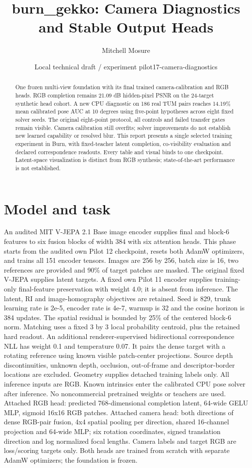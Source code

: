 \documentclass[10pt]{article}
\title{burn\_gekko: Camera Diagnostics and Stable Output Heads}\author{Mitchell Mosure}\date{Local technical draft / experiment pilot17-camera-diagnostics}
\begin{document}
\maketitle
\begin{abstract}
One frozen multi-view foundation with its final trained camera-calibration and RGB heads. RGB completion remains 21.09 dB hidden-pixel PSNR on the 24-target synthetic head cohort. A new CPU diagnostic on 186 real TUM pairs reaches 14.19\% mean calibrated pose AUC at 10 degrees using five-point hypotheses across eight fixed solver seeds. The original eight-point protocol, all controls and failed transfer gates remain visible. Camera calibration still overfits; solver improvements do not establish new learned capability or resolved blur. This report presents a single selected training experiment in Burn, with fixed-teacher latent completion, co-visibility evaluation and declared correspondence readouts. Every table and visual binds to one checkpoint. Latent-space visualization is distinct from RGB synthesis; state-of-the-art performance is not established.
\end{abstract}
\section{Model and task}
An audited MIT V-JEPA 2.1 Base image encoder supplies final and block-6 features to six fusion blocks of width 384 with six attention heads. This phase starts from the audited own Pilot 12 checkpoint, resets both AdamW optimizers, and trains all 151 encoder tensors. Images are 256 by 256, batch size is 16, two references are provided and 90\% of target patches are masked. The original fixed V-JEPA supplies latent targets. A fixed own Pilot 11 encoder supplies training-only final-feature preservation with weight 4.0; it is absent from inference. The latent, RI and image-homography objectives are retained. Seed is 829, trunk learning rate is 2e-5, encoder rate is 4e-7, warmup is 32 and the cosine horizon is 384 updates. The spatial residual is bounded by 25\% of the centered block-6 norm. Matching uses a fixed 3 by 3 local probability centroid, plus the retained hard readout. An additional renderer-supervised bidirectional correspondence NLL has weight 0.1 and temperature 0.07. It pairs the dense target with a rotating reference using known visible patch-center projections. Source depth discontinuities, unknown depth, occlusion, out-of-frame and descriptor-border locations are excluded. Geometry supplies detached training labels only. All inference inputs are RGB. Known intrinsics enter the calibrated CPU pose solver after inference. No noncommercial pretrained weights or teachers are used. Attached RGB head: predicted 768-dimensional completion latent, 64-wide GELU MLP, sigmoid 16x16 RGB patches. Attached camera head: both directions of dense RGB-pair fusion, 4x4 spatial pooling per direction, shared 16-channel projection and 64-wide MLP; six rotation coordinates, signed translation direction and log normalized focal lengths. Camera labels and target RGB are loss/scoring targets only. Both heads are trained from scratch with separate AdamW optimizers; the foundation is frozen.
\end{document}
